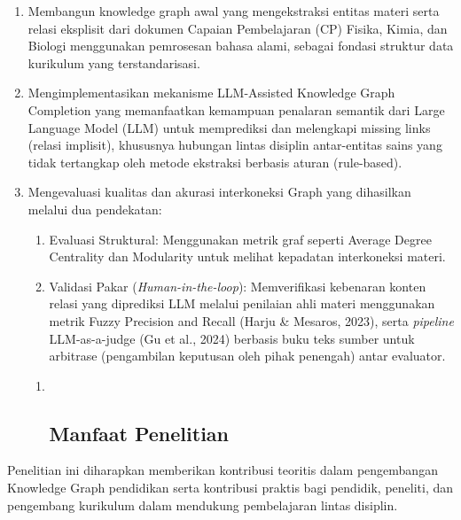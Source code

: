 \documentclass[
]{article}
\begin{document}
\begin{enumerate}
\def\labelenumi{\arabic{enumi}.}
\item
  Membangun knowledge graph awal yang mengekstraksi entitas materi serta
  relasi eksplisit dari dokumen Capaian Pembelajaran (CP) Fisika, Kimia,
  dan Biologi menggunakan pemrosesan bahasa alami, sebagai fondasi
  struktur data kurikulum yang terstandarisasi.
\item
  Mengimplementasikan mekanisme LLM-Assisted Knowledge Graph Completion
  yang memanfaatkan kemampuan penalaran semantik dari Large Language
  Model (LLM) untuk memprediksi dan melengkapi missing links (relasi
  implisit), khususnya hubungan lintas disiplin antar-entitas sains yang
  tidak tertangkap oleh metode ekstraksi berbasis aturan (rule-based).
\item
  Mengevaluasi kualitas dan akurasi interkoneksi Graph yang dihasilkan
  melalui dua pendekatan:

  \begin{enumerate}
  \def\labelenumii{\alph{enumii}.}
  \item
    Evaluasi Struktural: Menggunakan metrik graf seperti Average Degree
    Centrality dan Modularity untuk melihat kepadatan interkoneksi
    materi.
  \item
    Validasi Pakar (\emph{Human-in-the-loop}): Memverifikasi kebenaran
    konten relasi yang diprediksi LLM melalui penilaian ahli materi
    menggunakan metrik Fuzzy Precision and Recall (Harju \& Mesaros,
    2023), serta \emph{pipeline} LLM-as-a-judge (Gu et al., 2024)
    berbasis buku teks sumber untuk arbitrase (pengambilan keputusan
    oleh pihak penengah) antar evaluator.
  \end{enumerate}

  \begin{enumerate}
  \def\labelenumii{\arabic{enumii}.}
  \item ~
    \hypertarget{manfaat-penelitian}{%
    \subsection{Manfaat Penelitian}\label{manfaat-penelitian}}
  \end{enumerate}
\end{enumerate}

Penelitian ini diharapkan memberikan kontribusi teoritis dalam
pengembangan Knowledge Graph pendidikan serta kontribusi praktis bagi
pendidik, peneliti, dan pengembang kurikulum dalam mendukung
pembelajaran lintas disiplin.
\end{document}

